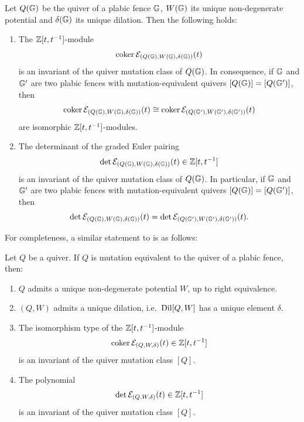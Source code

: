 \begin{corollary}\label{cor:unique_dilation_plabic_fence}
Let $Q(\mathbb G)$ be the quiver of a plabic fence $\mathbb G$, $W(\mathbb G)$ its unique non-degenerate potential and $\delta(\mathbb G)$ its unique dilation. Then the following holds:


\begin{enumerate}
\item The $\mathbb Z[t,t^{-1}]$-module
$$\operatorname{coker}\mathcal E_{(Q(\mathbb G),W(\mathbb G),\delta(\mathbb G))}(t)$$
is an invariant of the quiver mutation class of $Q(\mathbb G)$. In consequence, if $\mathbb G$ and $\mathbb G'$ are two plabic fences with mutation-equivalent quivers $[Q(\mathbb G)]=[Q(\mathbb G')]$, then
$$\operatorname{coker}\mathcal E_{(Q(\mathbb G),W(\mathbb G),\delta(\mathbb G))}(t)\cong\operatorname{coker}\mathcal E_{(Q(\mathbb G'),W(\mathbb G'),\delta(\mathbb G'))}(t)$$
are isomorphic $\mathbb Z[t,t^{-1}]$-modules.\\

    \item The determinant of the graded Euler pairing
$$\det\mathcal E_{(Q(\mathbb G),W(\mathbb G),\delta(\mathbb G))}(t)\in\mathbb Z[t,t^{-1}]$$
is an invariant of the quiver mutation class of $Q(\mathbb G)$. In particular, if $\mathbb G$ and $\mathbb G'$ are two plabic fences with mutation-equivalent quivers $[Q(\mathbb G)]=[Q(\mathbb G')]$, then
$$\det\mathcal E_{(Q(\mathbb G),W(\mathbb G),\delta(\mathbb G))}(t)=\det\mathcal E_{(Q(\mathbb G'),W(\mathbb G'),\delta(\mathbb G'))}(t).$$
\end{enumerate}
\end{corollary}

For completeness, a similar statement to  is as follows:
\begin{corollary}\label{cor:unique_dilation_mutation_equivalent_plabic_fence}
Let $Q$ be a quiver. If $Q$ is mutation equivalent to the quiver of a plabic fence, then:
\begin{enumerate}
    \item[$(i)$] $Q$ admits a unique non-degenerate potential $W$, up to right equivalence.

    \item[$(ii)$] $(Q,W)$ admits a unique dilation, i.e.~$\operatorname{Dil}[Q,W]$ has a unique element $\delta$.

    \item[$(iii)$] The isomorphism type of the $\mathbb Z[t,t^{-1}]$-module
    $$\operatorname{coker}\mathcal E_{(Q,W,\delta)}(t)\in\mathbb Z[t,t^{-1}]$$
    is an invariant of the quiver mutation class $[Q]$.\\

    \item[$(iv)$] The polynomial
    $$\det\mathcal E_{(Q,W,\delta)}(t)\in\mathbb Z[t,t^{-1}]$$
    is an invariant of the quiver mutation class $[Q]$.
\end{enumerate}
\end{corollary}

